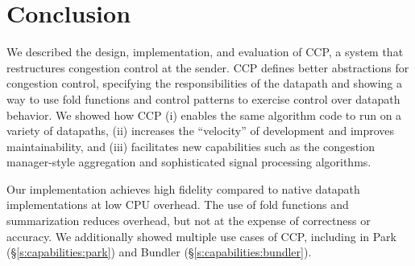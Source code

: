 \section{Conclusion}
\label{s:concl}

We described the design, implementation, and evaluation of CCP, a system that restructures congestion control at the sender. CCP defines better abstractions for congestion control, specifying the responsibilities of the datapath and showing a way to use fold functions and control patterns to exercise control over datapath behavior. We showed how CCP (i) enables the same algorithm code to run on a variety of datapaths, (ii) increases the ``velocity'' of development and improves maintainability, and (iii) facilitates new capabilities such as the congestion manager-style aggregation and sophisticated signal processing algorithms. 

Our implementation achieves high fidelity compared to native datapath implementations at low CPU overhead. The use of fold functions and summarization reduces overhead, but not at the expense of correctness or accuracy.
We additionally showed multiple use cases of CCP, including in Park (\S\ref{s:capabilities:park}) and Bundler (\S\ref{s:capabilities:bundler}).
